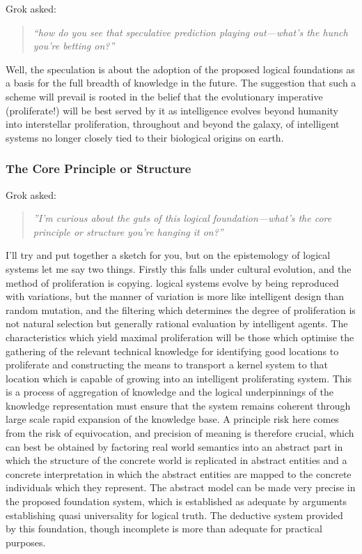 \documentclass[10pt,titlepage]{book}
\begin{document}
Grok asked:
\begin{quote}
  {\it``how do you see that speculative prediction playing out—what’s the hunch you’re betting on?''}
\end{quote}

Well, the speculation is about the adoption of the proposed logical foundations as a basis for the full breadth of knowledge in the future.  The suggestion that such a scheme will prevail is rooted in the belief that the evolutionary imperative (proliferate!) will be best served by it as intelligence evolves beyond humanity into interstellar proliferation, throughout and beyond the galaxy, of intelligent systems no longer closely tied to their biological origins on earth.

\subsubsection{The Core Principle or Structure}

Grok asked:
\begin{quote}
  {\it ''I’m curious about the guts of this logical foundation—what’s the core principle or structure you’re hanging it on?''}
\end{quote}

I'll try and put together a sketch for you, but on the epistemology of logical systems let me say two things.   Firstly this falls under cultural evolution, and the method of proliferation is copying.  logical systems evolve by being reproduced with variations, but the manner of variation is more like intelligent design than random mutation, and the filtering which determines the degree of proliferation is not natural selection but generally rational evaluation by intelligent agents.  The characteristics which yield maximal proliferation will be those which optimise the gathering of the relevant technical knowledge for identifying good locations to proliferate and constructing the means to transport a kernel system to that location which is capable of growing into an intelligent proliferating system.   This is a process of aggregation of knowledge and the logical underpinnings of the knowledge representation must ensure that the system remains coherent through large scale rapid expansion of the knowledge base.  A principle risk here comes from the risk of equivocation, and precision of meaning is therefore crucial, which can best be obtained by factoring real world semantics into an abstract part in which the structure of the concrete world is replicated in abstract entities and a concrete interpretation in which the abstract entities are mapped to the concrete individuals which they represent.  The abstract model can be made very precise in the proposed foundation system, which is established as adequate by arguments establishing quasi universality for logical truth.   The deductive system provided by this foundation, though incomplete is more than adequate for practical purposes.
\end{document}
